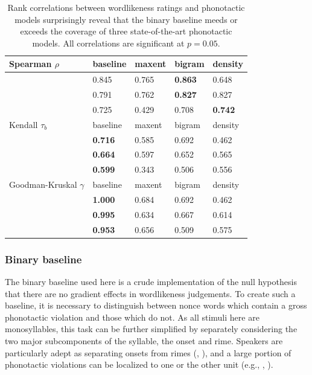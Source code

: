 \begin{table} \label{cor}
\centering
\begin{tabular}{l l l l l}
\toprule
Spearman $\rho$          & baseline         & maxent  & bigram           & density          \\
\midrule
\citealt{Greenberg1964}  & {0.845}          & {0.765} & {\textbf{0.863}} & {0.648}          \\
\citealt{Scholes1966}    & {0.791}          & {0.762} & {\textbf{0.827}} & {0.827}          \\
\citealt{Albright2003b}  & {0.725}          & {0.429} & {0.708}          & {\textbf{0.742}} \\
\midrule
Kendall $\tau_b$         & baseline         & maxent  & bigram           & density          \\
\midrule
\citealt{Greenberg1964}  & {\textbf{0.716}} & {0.585} & {0.692}          & {0.462}          \\
\citealt{Scholes1966}    & {\textbf{0.664}} & {0.597} & {0.652}          & {0.565}          \\
\citealt{Albright2003b}  & {\textbf{0.599}} & {0.343} & {0.506}          & {0.556}          \\
\midrule
Goodman-Kruskal $\gamma$ & baseline         & maxent  & bigram           & density          \\
\midrule
\citealt{Greenberg1964}  & {\textbf{1.000}} & {0.684} & {0.692}          & {0.462}          \\
\citealt{Scholes1966}    & {\textbf{0.995}} & {0.634} & {0.667}          & {0.614}          \\
\citealt{Albright2003b}  & {\textbf{0.953}} & {0.656} & {0.509}          & {0.575}          \\
\bottomrule
\end{tabular}
\caption{Rank correlations between wordlikeness ratings and phonotactic models surprisingly reveal that the binary baseline meeds or exceeds the coverage of three state-of-the-art phonotactic models. All correlations are significant at $p = 0.05$.}
\end{table}

\subsubsection{Binary baseline}

The binary baseline used here is a crude implementation of the null hypothesis that there are no gradient effects in wordlikeness judgements. To create such a baseline, it is necessary to distinguish between nonce words which contain a gross phonotactic violation and those which do not. As all stimuli here are monosyllables, this task can be further simplified by separately considering the two major subcomponents of the syllable, the onset and rime. Speakers are particularly adept as separating onsets from rimes (\citealt{Treiman1986,Treiman1995}, \citealt{Fowler1993}), and a large portion of phonotactic violations can be localized to one or the other unit (e.g., \citealt{Fudge1969}, \citealt{Treiman2000}).

